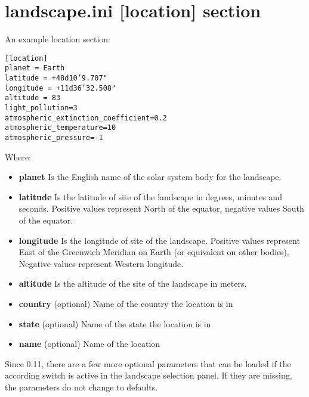 \section{landscape.ini {[}location{]}
section}\label{landscape.ini-location-section}

An example location section:

\begin{config}
\texttt{{[}location{]}}\\
\texttt{planet~=~Earth}\\
\texttt{latitude~=~+48d10'9.707"}\\
\texttt{longitude~=~+11d36'32.508"}\\
\texttt{altitude~=~83}\\
\texttt{light\_pollution=3}\\
\texttt{atmospheric\_extinction\_coefficient=0.2}\\
\texttt{atmospheric\_temperature=10}\\
\texttt{atmospheric\_pressure=-1}
\end{config}

Where:

\begin{itemize}
\item
  \textbf{planet} Is the English name of the solar system body for the
  landscape.
\item
  \textbf{latitude} Is the latitude of site of the landscape in degrees,
  minutes and seconds. Positive values represent North of the equator,
  negative values South of the equator.
\item
  \textbf{longitude} Is the longitude of site of the landscape. Positive
  values represent East of the Greenwich Meridian on Earth (or
  equivalent on other bodies), Negative values represent Western
  longitude.
\item
  \textbf{altitude} Is the altitude of the site of the landscape in
  meters.
\item
  \textbf{country} (optional) Name of the country the location is in
\item
  \textbf{state} (optional) Name of the state the location is in
\item
  \textbf{name} (optional) Name of the location
\end{itemize}

Since 0.11, there are a few more optional parameters that can be loaded
if the according switch is active in the landscape selection panel. If
they are missing, the parameters do not change to defaults.


